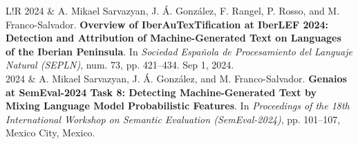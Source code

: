 \documentclass[10pt]{article}
\begin{document}
\begin{tabular}{L!{\VRule}R}
    2024 & A. Mikael Sarvazyan, J. Á. González, F. Rangel, P. Rosso, and M. Franco-Salvador. \textbf{Overview of IberAuTexTification at IberLEF 2024: Detection and Attribution of Machine-Generated Text on Languages of the Iberian Peninsula}. In \emph{Sociedad Española de Procesamiento del Languaje Natural (SEPLN)}, num. 73, pp. 421--434. Sep 1, 2024. \vspace{5pt}\\
    2024 & A. Mikael Sarvazyan, J. Á. González, and M. Franco-Salvador. \textbf{Genaios at SemEval-2024 Task 8: Detecting Machine-Generated Text by Mixing Language Model Probabilistic Features}. In \emph{Proceedings of the 18th International Workshop on Semantic Evaluation (SemEval-2024)}, pp. 101–107, Mexico City, Mexico.  \vspace{5pt}\\
\end{tabular}
\end{document}
